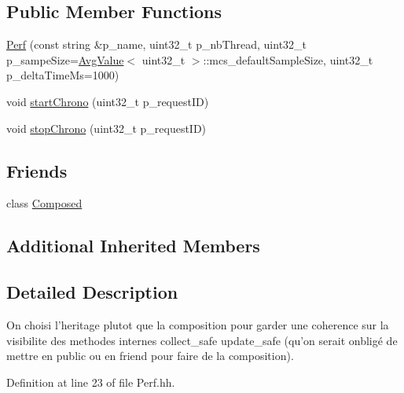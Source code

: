 \subsection*{Public Member Functions}
\begin{DoxyCompactItemize}
\item 
\hyperlink{classxtd_1_1counters_1_1Perf_a765416ba7ef076acdfc8100d2ea5c9a0}{Perf} (const string \&p\-\_\-name, uint32\-\_\-t p\-\_\-nb\-Thread, uint32\-\_\-t p\-\_\-sampe\-Size=\hyperlink{classxtd_1_1counters_1_1AvgValue}{Avg\-Value}$<$ uint32\-\_\-t $>$\-::mcs\-\_\-default\-Sample\-Size, uint32\-\_\-t p\-\_\-delta\-Time\-Ms=1000)
\item 
void \hyperlink{classxtd_1_1counters_1_1Perf_a80692e9b90e8d15a57e2e581591063c0}{start\-Chrono} (uint32\-\_\-t p\-\_\-request\-I\-D)
\item 
void \hyperlink{classxtd_1_1counters_1_1Perf_a905d73c1604d74e28bb56ea2bb4867ef}{stop\-Chrono} (uint32\-\_\-t p\-\_\-request\-I\-D)
\end{DoxyCompactItemize}
\subsection*{Friends}
\begin{DoxyCompactItemize}
\item 
class \hyperlink{classxtd_1_1counters_1_1Perf_a93e934ad70d5b32b14beed5572450abf}{Composed}
\end{DoxyCompactItemize}
\subsection*{Additional Inherited Members}


\subsection{Detailed Description}
On choisi l'heritage plutot que la composition pour garder une coherence sur la visibilite des methodes internes collect\-\_\-safe update\-\_\-safe (qu'on serait onbligé de mettre en public ou en friend pour faire de la composition). 

Definition at line 23 of file Perf.\-hh.



